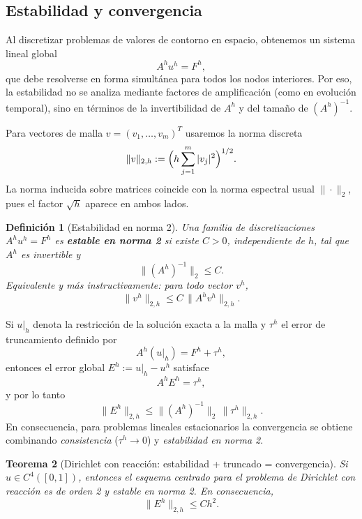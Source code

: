 \documentclass[a4paper,11pt]{report}
\newtheorem{theorem}{Teorema}[chapter]
\newtheorem{definition}[theorem]{Definición}
\begin{document}
\subsection{Estabilidad y convergencia}

Al discretizar problemas de valores de contorno en espacio, obtenemos un sistema lineal global
\[
  A^h u^h = F^h,
\]
que debe resolverse en forma simultánea para todos los nodos interiores. Por eso, la estabilidad no se analiza mediante factores de amplificación (como en evolución temporal), sino en términos de la invertibilidad de $A^h$ y del tamaño de $(A^h)^{-1}$.

Para vectores de malla $v=(v_1,\dots,v_m)^T$ usaremos la norma discreta
\[
  \|v\|_{2,h}:=\Bigl(h\sum_{j=1}^{m}|v_j|^2\Bigr)^{1/2}.
\]
La norma inducida sobre matrices coincide con la norma espectral usual $\|\cdot\|_2$, pues el factor $\sqrt h$ aparece en ambos lados.

\begin{definition}[Estabilidad en norma 2]
Una familia de discretizaciones $A^h u^h=F^h$ es \textbf{estable en norma 2} si existe $C>0$, independiente de $h$, tal que $A^h$ es invertible y
\[
  \|(A^h)^{-1}\|_2\le C.
\]
Equivalente y más instructivamente: para todo vector $v^h$,
\[
  \|v^h\|_{2,h}\le C\,\|A^h v^h\|_{2,h}.
\]
\end{definition}

Si $u|_h$ denota la restricción de la solución exacta a la malla y $\tau^h$ el error de truncamiento definido por
\[
  A^h(u|_h)=F^h+\tau^h,
\]
entonces el error global $E^h:=u|_h-u^h$ satisface
\[
  A^h E^h = \tau^h,
\]
y por lo tanto
\[
  \|E^h\|_{2,h}\le \|(A^h)^{-1}\|_2\,\|\tau^h\|_{2,h}.
\]
En consecuencia, para problemas lineales estacionarios la convergencia se obtiene combinando \emph{consistencia} ($\tau^h\to0$) y \emph{estabilidad en norma 2}.




\begin{theorem}[Dirichlet con reacción: estabilidad + truncado = convergencia]\label{thm:dirichlet_reaction_new}
Si $u\in C^4([0,1])$, entonces el esquema centrado para el problema de Dirichlet con reacción es de orden 2 y estable en norma 2. En consecuencia,
\[
  \|E^h\|_{2,h}\le Ch^2.
\]
\end{theorem}
\end{document}
